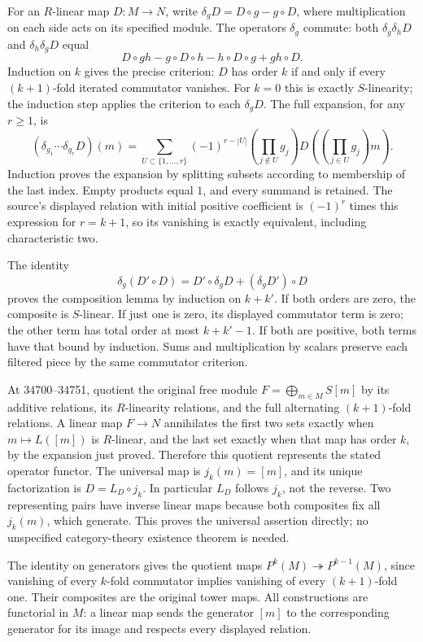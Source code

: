 For an \(R\)-linear map \(D:M\to N\), write \(\delta_gD=D\circ g-g\circ D\), where multiplication on each side acts on its specified module. The operators \(\delta_g\) commute: both \(\delta_g\delta_hD\) and \(\delta_h\delta_gD\) equal \[
D\circ gh-g\circ D\circ h-h\circ D\circ g+gh\circ D.
\] Induction on \(k\) gives the precise criterion: \(D\) has order \(k\) if and only if every \((k+1)\)-fold iterated commutator vanishes. For \(k=0\) this is exactly \(S\)-linearity; the induction step applies the criterion to each \(\delta_gD\). The full expansion, for any \(r\ge1\), is \[
(\delta_{g_1}\cdots\delta_{g_r}D)(m)
=\sum_{U\subset\{1,\ldots,r\}}(-1)^{r-|U|}
\left(\prod_{j\notin U}g_j\right)
D\left(\left(\prod_{j\in U}g_j\right)m\right).
\] Induction proves the expansion by splitting subsets according to membership of the last index. Empty products equal \(1\), and every summand is retained. The source's displayed relation with initial positive coefficient is \((-1)^r\) times this expression for \(r=k+1\), so its vanishing is exactly equivalent, including characteristic two.

The identity \[
\delta_g(D'\circ D)=D'\circ\delta_gD+(\delta_gD')\circ D
\] proves the composition lemma by induction on \(k+k'\). If both orders are zero, the composite is \(S\)-linear. If just one is zero, its displayed commutator term is zero; the other term has total order at most \(k+k'-1\). If both are positive, both terms have that bound by induction. Sums and multiplication by scalars preserve each filtered piece by the same commutator criterion.

At 34700--34751, quotient the original free module \(F=\bigoplus_{m\in M}S[m]\) by its additive relations, its \(R\)-linearity relations, and the full alternating \((k+1)\)-fold relations. A linear map \(F\to N\) annihilates the first two sets exactly when \(m\mapsto L([m])\) is \(R\)-linear, and the last set exactly when that map has order \(k\), by the expansion just proved. Therefore this quotient represents the stated operator functor. The universal map is \(j_k(m)=[m]\), and its unique factorization is \(D=L_D\circ j_k\). In particular \(L_D\) follows \(j_k\), not the reverse. Two representing pairs have inverse linear maps because both composites fix all \(j_k(m)\), which generate. This proves the universal assertion directly; no unspecified category-theory existence theorem is needed.

The identity on generators gives the quotient maps \(P^k(M)\twoheadrightarrow P^{k-1}(M)\), since vanishing of every \(k\)-fold commutator implies vanishing of every \((k+1)\)-fold one. Their composites are the original tower maps. All constructions are functorial in \(M\): a linear map sends the generator \([m]\) to the corresponding generator for its image and respects every displayed relation.

